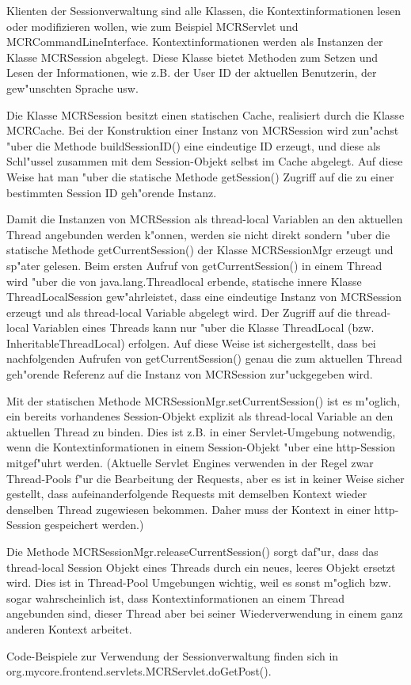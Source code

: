 Klienten der Sessionverwaltung sind alle Klassen, die Kontextinformationen lesen oder
modifizieren wollen, wie zum Beispiel MCRServlet und MCRCommandLineInterface.
Kontextinformationen werden als Instanzen der Klasse MCRSession abgelegt.
Diese Klasse bietet Methoden zum Setzen und Lesen der Informationen, wie z.B.
der User ID der aktuellen Benutzerin, der gew"unschten Sprache usw. 

Die Klasse MCRSession besitzt einen statischen Cache, realisiert durch die Klasse MCRCache.
Bei der Konstruktion einer Instanz von MCRSession wird zun"achst "uber die Methode 
buildSessionID() eine eindeutige ID erzeugt, und diese als Schl"ussel zusammen
mit dem Session-Objekt selbst im Cache abgelegt.
Auf diese Weise hat man "uber die statische Methode getSession() Zugriff auf die zu
einer bestimmten Session ID geh"orende Instanz.

Damit die Instanzen von MCRSession als thread-local Variablen an den aktuellen
Thread angebunden werden k"onnen, werden sie nicht direkt sondern "uber die
statische Methode getCurrentSession() der Klasse MCRSessionMgr erzeugt und sp"ater gelesen.
Beim ersten Aufruf von getCurrentSession() in einem Thread wird "uber die von 
java.lang.Threadlocal erbende, statische innere Klasse ThreadLocalSession gew"ahrleistet, 
dass eine eindeutige Instanz von MCRSession erzeugt und als thread-local Variable
abgelegt wird.
Der Zugriff auf die thread-local Variablen eines Threads kann nur "uber die Klasse
ThreadLocal (bzw. InheritableThreadLocal) erfolgen.
Auf diese Weise ist sichergestellt, dass bei nachfolgenden Aufrufen von getCurrentSession()
genau die zum aktuellen Thread geh"orende Referenz auf die Instanz von MCRSession 
zur"uckgegeben wird. 

Mit der statischen Methode MCRSessionMgr.setCurrentSession() ist es m"oglich, ein 
bereits vorhandenes Session-Objekt explizit als thread-local Variable an den aktuellen
Thread zu binden.
Dies ist z.B. in einer Servlet-Umgebung notwendig, wenn die Kontextinformationen in
einem Session-Objekt "uber eine http-Session mitgef"uhrt werden.
(Aktuelle Servlet Engines verwenden in der Regel zwar Thread-Pools f"ur die Bearbeitung 
der Requests, aber es ist in keiner Weise sicher gestellt, dass aufeinanderfolgende
Requests mit demselben Kontext wieder denselben Thread zugewiesen bekommen.
Daher muss der Kontext in einer http-Session gespeichert werden.)

Die Methode MCRSessionMgr.releaseCurrentSession() sorgt daf"ur, dass das thread-local
Session Objekt eines Threads durch ein neues, leeres Objekt ersetzt wird.
Dies ist in Thread-Pool Umgebungen wichtig, weil es sonst m"oglich bzw. sogar 
wahrscheinlich ist, dass Kontextinformationen an einem Thread angebunden sind, dieser 
Thread aber bei seiner Wiederverwendung in einem ganz anderen Kontext arbeitet.
 
Code-Beispiele zur Verwendung der Sessionverwaltung finden sich in\\ 
org.mycore.frontend.servlets.MCRServlet.doGetPost().
